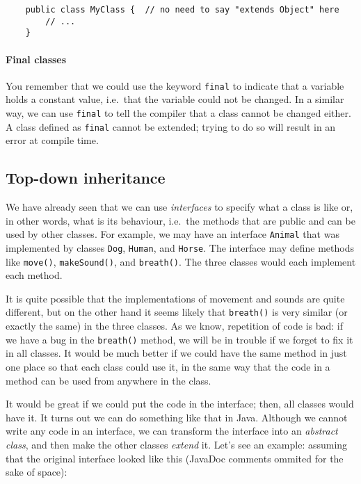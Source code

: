 \begin{verbatim}
    public class MyClass {  // no need to say "extends Object" here
        // ...              
    }
\end{verbatim}

\paragraph{Final classes}
\label{sec:final-classes}

You remember that we could use the keyword \verb+final+ to indicate
that a variable holds a constant value, i.e.~that the variable could
not be changed. In a similar way, we can use \verb+final+ to tell the compiler
that a class cannot be changed either. A class defined as \verb+final+
cannot be extended; trying to do so will result in an error at compile
time. 


\subsection{Top-down inheritance}
\label{sec:top-down-inheritance}

We have already seen that we can use \emph{interfaces} to specify what a
class is like or, in other words, what is its behaviour, i.e.~the methods
that are public and can be used by other classes. For example, we may
have an interface \verb+Animal+ that was implemented by classes
\verb+Dog+, \verb+Human+, and \verb+Horse+. The interface may define
methods like \verb+move()+, \verb+makeSound()+, and
\verb+breath()+. The three classes would each implement each method. 

It is quite possible that the implementations of movement and
sounds are quite different, but on the other hand it seems likely that
\verb+breath()+ is very similar (or exactly the same) in the three
classes. As we know, repetition of code is bad: if we have a bug
in the \verb+breath()+ method, we will be in trouble if we forget to
fix it in all classes. It would be much better if we could have the
same method in just one place so that each class could use it, in the
same way that the code in a method can be used from anywhere in the
class. 

It would be great if we could put the code in the interface; then, all
classes would have it. It turns out we can do something like
that in Java. Although we cannot write any code in an interface, 
we can transform the interface into an \emph{abstract class}, and then
make the other classes \emph{extend} it. Let's see an example: assuming
that the original interface looked like this (JavaDoc comments ommited
for the sake of space):

